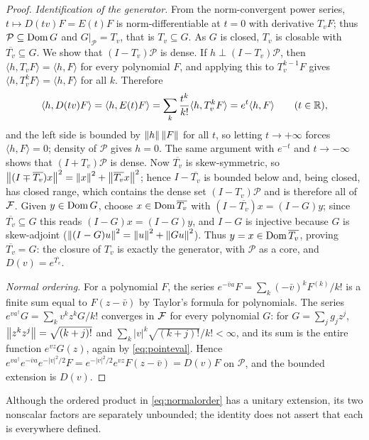 \begin{proof}
\emph{Identification of the generator.} From the norm-convergent power
series, $t\mapsto D(tv)F=E(t)F$ is norm-differentiable at $t=0$ with
derivative $T_vF$; thus $\mathcal P\subseteq\operatorname{Dom} G$ and $G|_{\mathcal P}=T_v$,
that is $T_v\subseteq G$. As $G$ is closed, $T_v$ is closable with
$\overline{T_v}\subseteq G$. We show that $(I-T_v)\mathcal P$ is dense. If
$h\perp(I-T_v)\mathcal P$, then $\langle h,T_vF\rangle=\langle h,F\rangle$
for every polynomial $F$, and applying this to $T_v^{k-1}F$ gives
$\langle h,T_v^kF\rangle=\langle h,F\rangle$ for all $k$. Therefore
\[
 \langle h,D(tv)F\rangle=\langle h,E(t)F\rangle
 =\sum_k\frac{t^k}{k!}\langle h,T_v^kF\rangle=e^{t}\langle h,F\rangle
 \qquad(t\in\mathbb{R}),
\]
and the left side is bounded by $\left\lVert h\right\rVert\left\lVert F\right\rVert$ for all $t$, so letting
$t\to+\infty$ forces $\langle h,F\rangle=0$; density of $\mathcal P$ gives
$h=0$. The same argument with $e^{-t}$ and $t\to-\infty$ shows that
$(I+T_v)\mathcal P$ is dense. Now $\overline{T_v}$ is skew-symmetric, so
$\left\lVert(I\mp\overline{T_v})x\right\rVert^2=\left\lVert x\right\rVert^2+\left\lVert\overline{T_v}x\right\rVert^2$; hence
$I-\overline{T_v}$ is bounded below and, being closed, has closed range,
which contains the dense set $(I-T_v)\mathcal P$ and is therefore all of
$\mathcal{F}$. Given $y\in\operatorname{Dom} G$, choose $x\in\operatorname{Dom}\overline{T_v}$ with
$(I-\overline{T_v})x=(I-G)y$; since $\overline{T_v}\subseteq G$ this reads
$(I-G)x=(I-G)y$, and $I-G$ is injective because $G$ is skew-adjoint
($\left\lVert(I-G)u\right\rVert^2=\left\lVert u\right\rVert^2+\left\lVert Gu\right\rVert^2$). Thus $y=x\in\operatorname{Dom}\overline{T_v}$,
proving $\overline{T_v}=G$: the closure of $T_v$ is exactly the generator,
with $\mathcal P$ as a core, and $D(v)=e^{\overline{T_v}}$.

\emph{Normal ordering.} For a polynomial $F$, the series
$e^{-\bar va}F=\sum_k(-\bar v)^kF^{(k)}/k!$ is a finite sum equal to
$F(z-\bar v)$ by Taylor's formula for polynomials. The series
$e^{va^\dagger}G=\sum_kv^kz^kG/k!$ converges in $\mathcal{F}$ for every polynomial
$G$: for $G=\sum_jg_jz^j$, $\left\lVert z^kz^j\right\rVert=\sqrt{(k+j)!}$ and
$\sum_k|v|^k\sqrt{(k+j)!}/k!<\infty$, and its sum is the entire function
$e^{vz}G(z)$, again by \eqref{eq:pointeval}. Hence
$e^{va^\dagger}e^{-\bar va}e^{-|v|^2/2}F=e^{-|v|^2/2}e^{vz}F(z-\bar v)=D(v)F$
on $\mathcal P$, and the bounded extension is $D(v)$.
\end{proof}
Although the ordered product in \eqref{eq:normalorder} has a unitary
extension, its two nonscalar factors are separately unbounded; the identity
does not assert that each is everywhere defined.

